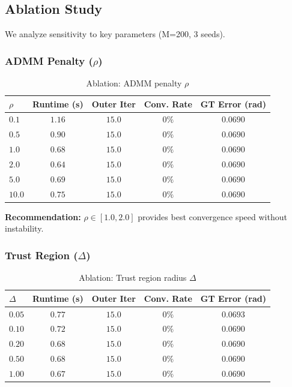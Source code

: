 \subsection{Ablation Study}
\label{sec:ablation}

We analyze sensitivity to key parameters (M=200, 3 seeds).

\subsubsection{ADMM Penalty ($\rho$)}

\begin{table}[htbp]
\centering
\caption{Ablation: ADMM penalty $\rho$}
\label{tab:ablation_rho}
\begin{tabular}{l c c c c}
\hline
\textbf{$\rho$} & \textbf{Runtime (s)} & \textbf{Outer Iter} & \textbf{Conv. Rate} & \textbf{GT Error (rad)} \\
\hline
$0.1$ & $1.16$ & $15.0$ & $0\%$ & $0.0690$ \\
$0.5$ & $0.90$ & $15.0$ & $0\%$ & $0.0690$ \\
$1.0$ & $0.68$ & $15.0$ & $0\%$ & $0.0690$ \\
$2.0$ & $0.64$ & $15.0$ & $0\%$ & $0.0690$ \\
$5.0$ & $0.69$ & $15.0$ & $0\%$ & $0.0690$ \\
$10.0$ & $0.75$ & $15.0$ & $0\%$ & $0.0690$ \\
\hline
\end{tabular}
\end{table}

\textbf{Recommendation:} $\rho \in [1.0, 2.0]$ provides best convergence speed without instability.

\subsubsection{Trust Region ($\Delta$)}

\begin{table}[htbp]
\centering
\caption{Ablation: Trust region radius $\Delta$}
\label{tab:ablation_delta}
\begin{tabular}{l c c c c}
\hline
\textbf{$\Delta$} & \textbf{Runtime (s)} & \textbf{Outer Iter} & \textbf{Conv. Rate} & \textbf{GT Error (rad)} \\
\hline
$0.05$ & $0.77$ & $15.0$ & $0\%$ & $0.0693$ \\
$0.10$ & $0.72$ & $15.0$ & $0\%$ & $0.0690$ \\
$0.20$ & $0.68$ & $15.0$ & $0\%$ & $0.0690$ \\
$0.50$ & $0.68$ & $15.0$ & $0\%$ & $0.0690$ \\
$1.00$ & $0.67$ & $15.0$ & $0\%$ & $0.0690$ \\
\hline
\end{tabular}
\end{table}

